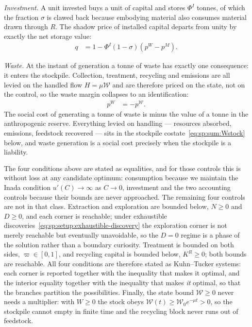 \emph{Investment.} A unit invested buys a unit of capital and stores $\Phi^I$ tonnes, of which the fraction $\sigma$ is clawed back because embodying material also consumes material drawn through $R$. The shadow price of installed capital departs from unity by exactly the net storage value:
\begin{align}
q &= 1-\Phi^I\left(1-\sigma\right)\left(p^W-p^M\right).
\label{eq:sp:sum:I}
\end{align}

\emph{Waste.} At the instant of generation a tonne of waste has exactly one consequence: it enters the stockpile. Collection, treatment, recycling and emissions are all levied on the handled flow $H=\mu\mathcal W$ and are therefore priced on the state, not on the control, so the waste margin collapses to an identification:
\begin{align}
p^W &= -p^{\mathcal W} .
\label{eq:sp:sum:W}
\end{align}
The social cost of generating a tonne of waste is minus the value of a tonne in the anthropogenic reserve. Everything levied on handling --- resources absorbed, emissions, feedstock recovered --- sits in the stockpile costate~\eqref{eq:sp:sum:Wstock} below, and waste generation is a social cost precisely when the stockpile is a liability.

 The four conditions above are stated as equalities, and for
those controls this is without loss at any candidate optimum: consumption because we maintain the
Inada condition $u'\left(C\right)\to\infty$ as $C\to0$, investment and the two accounting controls
because their bounds are never approached. The remaining four controls are not in that class.
Extraction and exploration are bounded below, $N\ge0$ and $D\ge0$, and each corner is reachable;
under exhaustible discoveries~\eqref{eq:sp:setup:exhaustible-discovery} the exploration corner is
not merely reachable but eventually unavoidable, so the $D=0$ regime is a phase of the solution
rather than a boundary curiosity. Treatment is bounded on both sides, $\varpi\in\left[0,1\right]$,
and recycling capital is bounded below, $K^R\ge0$; both bounds are reachable. All four conditions
are therefore stated as Kuhn--Tucker systems: each corner is reported together with the inequality
that makes it optimal, and the interior equality together with the inequality that makes \emph{it}
optimal, so that the branches partition the possibilities. Finally, the state bound $\mathcal W\ge0$
never needs a multiplier: with $W\ge0$ the stock obeys $\mathcal W\left(t\right)\ge\mathcal W_0e^{-\mu t}>0$,
so the stockpile cannot empty in finite time and the recycling block never runs out of feedstock.

